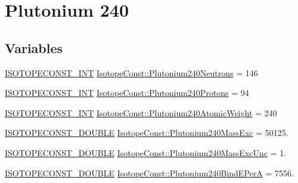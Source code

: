 \hypertarget{group___isotope_const-_plutonium-_pu240}{}\section{Plutonium 240}
\label{group___isotope_const-_plutonium-_pu240}
\subsection*{Variables}
\begin{DoxyCompactItemize}
\item 
\mbox{\hyperlink{group___isotope_const-_macros_ga5f18360b3e99483a35c32d789e62621c}{I\+S\+O\+T\+O\+P\+E\+C\+O\+N\+S\+T\+\_\+\+I\+NT}} \mbox{\hyperlink{group___isotope_const-_plutonium-_pu240_ga66ff89f0b360eb6008a16902817c3bb3}{Isotope\+Const\+::\+Plutonium240\+Neutrons}} = 146
\item 
\mbox{\hyperlink{group___isotope_const-_macros_ga5f18360b3e99483a35c32d789e62621c}{I\+S\+O\+T\+O\+P\+E\+C\+O\+N\+S\+T\+\_\+\+I\+NT}} \mbox{\hyperlink{group___isotope_const-_plutonium-_pu240_gaa6046cdb1bb6137a0f2e958d3499d164}{Isotope\+Const\+::\+Plutonium240\+Protons}} = 94
\item 
\mbox{\hyperlink{group___isotope_const-_macros_ga5f18360b3e99483a35c32d789e62621c}{I\+S\+O\+T\+O\+P\+E\+C\+O\+N\+S\+T\+\_\+\+I\+NT}} \mbox{\hyperlink{group___isotope_const-_plutonium-_pu240_gad76f0090d641fef2af4e9b0c33260a66}{Isotope\+Const\+::\+Plutonium240\+Atomic\+Weight}} = 240
\item 
\mbox{\hyperlink{group___isotope_const-_macros_ga8f45a7272ce02c0b4c65c44636ed719a}{I\+S\+O\+T\+O\+P\+E\+C\+O\+N\+S\+T\+\_\+\+D\+O\+U\+B\+LE}} \mbox{\hyperlink{group___isotope_const-_plutonium-_pu240_ga51b2b95c024cd607e34d0a0f23798fc3}{Isotope\+Const\+::\+Plutonium240\+Mass\+Exc}} = 50125.
\item 
\mbox{\hyperlink{group___isotope_const-_macros_ga8f45a7272ce02c0b4c65c44636ed719a}{I\+S\+O\+T\+O\+P\+E\+C\+O\+N\+S\+T\+\_\+\+D\+O\+U\+B\+LE}} \mbox{\hyperlink{group___isotope_const-_plutonium-_pu240_gab02ab2398470e8dbd7febd46c0b0576a}{Isotope\+Const\+::\+Plutonium240\+Mass\+Exc\+Unc}} = 1.
\item 
\mbox{\hyperlink{group___isotope_const-_macros_ga8f45a7272ce02c0b4c65c44636ed719a}{I\+S\+O\+T\+O\+P\+E\+C\+O\+N\+S\+T\+\_\+\+D\+O\+U\+B\+LE}} \mbox{\hyperlink{group___isotope_const-_plutonium-_pu240_gadb4bd0dacc23ea65e6ad55fdd4013fec}{Isotope\+Const\+::\+Plutonium240\+Bind\+E\+PerA}} = 7556.
\item 

\end{DoxyCompactItemize}
